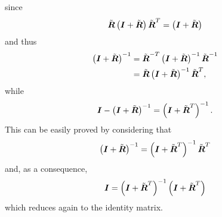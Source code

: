 \documentclass[10pt,dvips,fleqn]{report}
\newcommand{\T}[1]{\boldsymbol{#1}}
\begin{document}
since
\begin{equation}
	\tilde{\T{R}}\plbr{\T{I} + \tilde{\T{R}}} \tilde{\T{R}}^T = \plbr{\T{I} + \tilde{\T{R}}}
\end{equation}
and thus
\begin{align}
	\plbr{\T{I} + \tilde{\T{R}}}^{-1}
	&= \tilde{\T{R}}^{-T} \plbr{\T{I} + \tilde{\T{R}}}^{-1} \tilde{\T{R}}^{-1} \\
	&= \tilde{\T{R}} \plbr{\T{I} + \tilde{\T{R}}}^{-1} \tilde{\T{R}}^T ,
\end{align}
while
\begin{equation}
	\T{I} - \plbr{\T{I} + \tilde{\T{R}}}^{-1} = \plbr{\T{I} + \tilde{\T{R}}^T}^{-1} .
\end{equation}
This can be easily proved by considering that
\begin{equation}
	\plbr{\T{I} + \tilde{\T{R}}}^{-1} = \plbr{\T{I} + \tilde{\T{R}}^T}^{-1} \tilde{\T{R}}^T
	\label{eq:inv-deformable-hinge-I-tilde}
\end{equation}
and, as a consequence,
\begin{equation}
	\T{I} = \plbr{\T{I} + \tilde{\T{R}}^T}^{-1} \plbr{\T{I} + \tilde{\T{R}}^T}
\end{equation}
which reduces again to the identity matrix.
\end{document}

